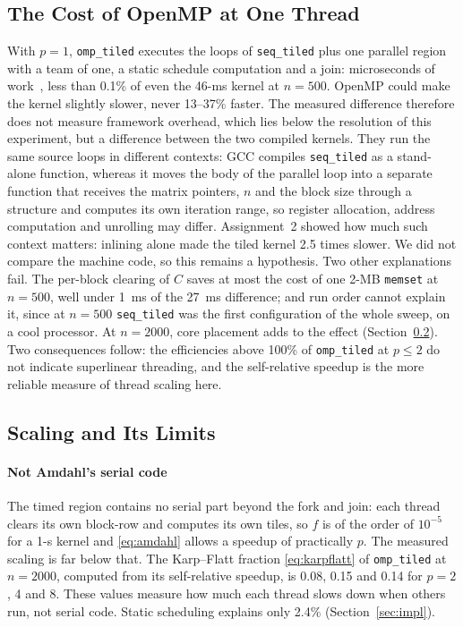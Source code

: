 \documentclass[conference,a4paper]{IEEEtran}
\newcommand{\code}[1]{\texttt{#1}}
\newcommand{\seqk}{\code{seq\_tiled}}
\newcommand{\ompk}{\code{omp\_tiled}}
\begin{document}
\subsection{The Cost of OpenMP at One Thread}
\label{sec:disc-p1}
With $p = 1$, \ompk{} executes the loops of \seqk{} plus one parallel region
with a team of one, a static schedule computation and a join: microseconds of
work~\cite{bull1999}, less than 0.1\% of even the 46-ms kernel at $n = 500$.
OpenMP could make the kernel slightly slower, never 13--37\% faster. The
measured difference therefore does not measure framework overhead, which lies
below the resolution of this experiment, but a difference between the two
compiled kernels. They run the same source loops in different contexts: GCC
compiles \seqk{} as a stand-alone function, whereas it moves the body of the
parallel loop into a separate function that receives the matrix pointers, $n$
and the block size through a structure and computes its own iteration range,
so register
allocation, address computation and unrolling may differ. Assignment~2 showed
how much such context matters: inlining alone made the tiled kernel 2.5 times
slower. We did not compare the machine code, so this remains a hypothesis.
Two other explanations fail. The per-block clearing of $C$ saves at most the
cost of one 2-MB \code{memset} at $n = 500$, well under 1~ms of the 27~ms
difference; and run order cannot explain it, since at $n = 500$ \seqk{} was
the first configuration of the whole sweep, on a cool processor. At
$n = 2000$, core placement adds to the effect (Section~\ref{sec:disc-scaling}).
Two consequences follow: the efficiencies above 100\% of \ompk{} at $p \le 2$
do not indicate superlinear threading, and the self-relative speedup is the
more reliable measure of thread scaling here.

\subsection{Scaling and Its Limits}
\label{sec:disc-scaling}
\paragraph{Not Amdahl's serial code} The timed region contains no serial part
beyond the fork and join: each thread clears its own block-row and computes
its own tiles, so $f$ is of the order of $10^{-5}$ for a 1-s kernel and
\eqref{eq:amdahl}
allows a speedup of practically $p$. The measured scaling is far below that.
The Karp--Flatt fraction \eqref{eq:karpflatt} of \ompk{} at $n = 2000$,
computed from its self-relative speedup, is 0.08, 0.15 and 0.14 for $p = 2$, 4
and 8. These values measure how much each thread slows down when others run,
not serial code. Static scheduling explains only 2.4\% (Section~\ref{sec:impl}).
\end{document}
